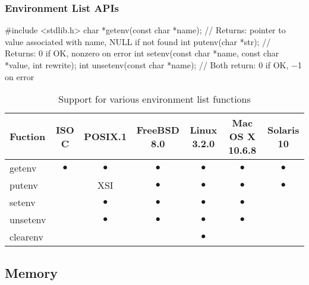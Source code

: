\documentclass[newPxFont,sthlmFooter,nooffset]{beamer}
\begin{document}
\begin{frame}[containsverbatim,t]
  \frametitle{Environment List APIs}

\begin{codedef}
#include <stdlib.h>
char *getenv(const char *name);
// Returns: pointer to value associated with name, NULL if not found
int putenv(char *str);
// Returns: 0 if OK, nonzero on error
int setenv(const char *name, const char *value, int rewrite);
int unsetenv(const char *name);
// Both return: 0 if OK, −1 on error
\end{codedef}
{\footnotesize
\begin{table}[h]
  \centering
  \begin{tabular}{l | c c | *{4}{c}  }
    Fuction & ISO C & POSIX.1 & \parbox{5em}{\centering FreeBSD 8.0} & \parbox{5ex}{\centering Linux 3.2.0} & \parbox{5em}{\centering Mac OS X 10.6.8} & \parbox{5em}{\centering Solaris 10} \\ \hline \hline
    getenv  & $\bullet$ & $\bullet$ & $\bullet$ & $\bullet$ & $\bullet$ & $\bullet$ \\
    putenv  &           &   XSI     & $\bullet$ & $\bullet$ & $\bullet$ & $\bullet$ \\
    setenv  &           & $\bullet$ & $\bullet$ & $\bullet$ & $\bullet$ &           \\
  unsetenv  &           & $\bullet$ & $\bullet$ & $\bullet$ & $\bullet$ &           \\
  clearenv  &           &           &           & $\bullet$ &           &           \\
  \end{tabular}
  \caption{Support for various environment list functions}
  \label{tab:support}
\end{table}
}
\end{frame}


\subsection{Memory}
\end{document}
